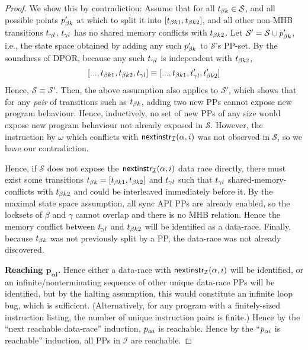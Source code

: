 \begin{proof}
We show this by contradiction:
%
Assume that for all $t_{\beta{}k} \in \mathcal{S}$,
and all possible points $p_{\beta{}k}'$ at which to split it into $[t_{\beta{}k1},t_{\beta{}k2}]$,
and all other non-MHB transitions $t_{\gamma{}l}$,
$t_{\gamma{}l}$ has no shared memory conflicts with $t_{\beta{}k2}$.
%
Let $\mathcal{S}' = \mathcal{S} \cup p_{\beta{}k}'$, i.e., the state space obtained by adding any such $p_{\beta{}k}'$ to $\mathcal{S}$'s PP-set.
By the soundness of DPOR, because any such $t_{\gamma{}l}$ is independent with $t_{\beta{}k2}$,
\[
	[..., t_{\beta{}k1}, t_{\beta{}k2}, t_{\gamma{}l}]
	\equiv
	[..., t_{\beta{}k1}, t_{\gamma{}l}', t_{\beta{}k2}']
\]
Hence, $\mathcal{S} \equiv \mathcal{S}'$. %
Then, the above assumption also applies to $\mathcal{S}'$,
which shows that for any {\em pair} of transitions such as $t_{\beta{}k}$, adding two new PPs cannot expose new program behaviour.
Hence, inductively, no set of new PPs of any size would expose new program behaviour not already exposed in $\mathcal{S}$.
However, the instruction by $\omega$ which conflicts with $\mathsf{nextinstr}_{\mathcal{I}}(\alpha,i)$ was not observed in $\mathcal{S}$,
so we have our contradiction.

Hence, if $\mathcal{S}$ does not expose the $\mathsf{nextinstr}_{\mathcal{I}}(\alpha,i)$ data race directly,
there must exist some transitions $t_{\beta{}k} = [t_{\beta{}k1},t_{\beta{}k2}]$ and $t_{\gamma{}l}$ such that $t_{\gamma{}l}$ shared-memory-conflicts with $t_{\beta{}k2}$ and could be interleaved immediately before it.
By the maximal state space assumption, all sync API PPs are already enabled, so the locksets of $\beta$ and $\gamma$ cannot overlap and there is no MHB relation.
Hence the memory conflict between $t_{\gamma{}l}$ and $t_{\beta{}k2}$ will be identified as a data-race.
Finally, because $t_{\beta{}k}$ was not previously split by a PP, the data-race was not already discovered.

{\bf Reaching $\mathbf{p_{\alpha{}i}}$.}
Hence either a data-race with $\mathsf{nextinstr}_{\mathcal{I}}(\alpha,i)$ will be identified,
or an infinite/nonterminating sequence of other unique data-race PPs will be identified,
but by the halting assumption, this would constitute an infinite loop bug, which is sufficient.
(Alternatively, for any program with a finitely-sized instruction listing, the number of unique instruction pairs is finite.)
Hence by the ``next reachable data-race'' induction, $p_{\alpha{}i}$ is reachable.
Hence by the ``$p_{\alpha{}i}$ is reachable'' induction, all PPs in $\mathcal{I}$ are reachable.
\end{proof}

